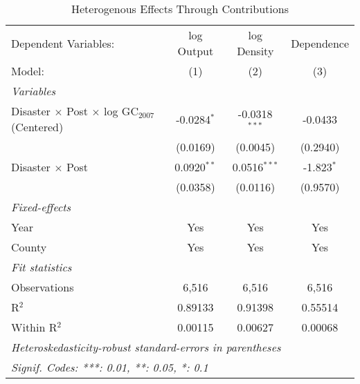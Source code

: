 
\begin{table}[htbp]
   \caption{Heterogenous Effects Through Contributions}
   \centering
   \begin{adjustbox}{max width = \textwidth, center}
      \begin{tabular}{lccc}
         \tabularnewline \midrule \midrule
         Dependent Variables:                                         & log Output    & log Density     & Dependence\\  
         Model:                                                       & (1)           & (2)             & (3)\\  
         \midrule
         \emph{Variables}\\
         Disaster $\times$ Post $\times$ log GC$_{2007}$ (Centered)   & -0.0284$^{*}$ & -0.0318$^{***}$ & -0.0433\\   
                                                                      & (0.0169)      & (0.0045)        & (0.2940)\\   
         Disaster $\times$ Post                                       & 0.0920$^{**}$ & 0.0516$^{***}$  & -1.823$^{*}$\\   
                                                                      & (0.0358)      & (0.0116)        & (0.9570)\\   
         \midrule
         \emph{Fixed-effects}\\
         Year                                                         & Yes           & Yes             & Yes\\  
         County                                                       & Yes           & Yes             & Yes\\  
         \midrule
         \emph{Fit statistics}\\
         Observations                                                 & 6,516         & 6,516           & 6,516\\  
         R$^2$                                                        & 0.89133       & 0.91398         & 0.55514\\  
         Within R$^2$                                                 & 0.00115       & 0.00627         & 0.00068\\  
         \midrule \midrule
         \multicolumn{4}{l}{\emph{Heteroskedasticity-robust standard-errors in parentheses}}\\
         \multicolumn{4}{l}{\emph{Signif. Codes: ***: 0.01, **: 0.05, *: 0.1}}\\
      \end{tabular}
   \end{adjustbox}
\end{table}



